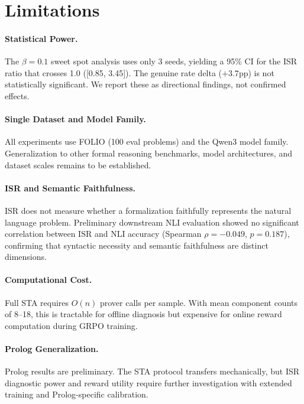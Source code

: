 \documentclass[11pt,a4paper]{article}
\begin{document}
\section{Limitations}

\paragraph{Statistical Power.}
The $\beta{=}0.1$ sweet spot analysis uses only 3 seeds, yielding a 95\% CI for the ISR ratio that crosses 1.0 ([0.85, 3.45]).
The genuine rate delta ($+3.7$pp) is not statistically significant.
We report these as directional findings, not confirmed effects.

\paragraph{Single Dataset and Model Family.}
All experiments use FOLIO (100 eval problems) and the Qwen3 model family.
Generalization to other formal reasoning benchmarks, model architectures, and dataset scales remains to be established.

\paragraph{ISR and Semantic Faithfulness.}
ISR does not measure whether a formalization faithfully represents the natural language problem.
Preliminary downstream NLI evaluation showed no significant correlation between ISR and NLI accuracy (Spearman $\rho = -0.049$, $p = 0.187$), confirming that syntactic necessity and semantic faithfulness are distinct dimensions.

\paragraph{Computational Cost.}
Full STA requires $O(n)$ prover calls per sample.
With mean component counts of 8--18, this is tractable for offline diagnosis but expensive for online reward computation during GRPO training.

\paragraph{Prolog Generalization.}
Prolog results are preliminary.
The STA protocol transfers mechanically, but ISR diagnostic power and reward utility require further investigation with extended training and Prolog-specific calibration.
\end{document}
